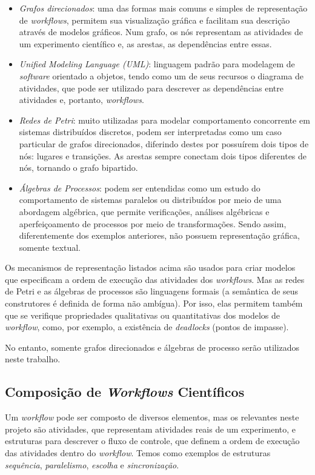 \documentclass[a4paper,11pt]{article}
\begin{document}
  	\begin{itemize}
  		\item \emph{Grafos direcionados}: uma das formas mais comuns e simples de representação de \emph{workflows}, permitem sua visualização gráfica e facilitam sua descrição através de modelos gráficos. Num grafo, os nós representam as atividades de um experimento científico e, as arestas, as dependências entre essas.

  		\item \emph{\emph{Unified Modeling Language} (UML)}: linguagem padrão para modelagem de \emph{software} orientado a objetos, tendo como um de seus recursos o diagrama de atividades, que pode ser utilizado para descrever as dependências entre atividades e, portanto, \emph{workflows}. 

        \item \emph{Redes de Petri}: muito utilizadas para modelar comportamento concorrente em sistemas distribuídos discretos, podem ser interpretadas como um caso particular de grafos direcionados, diferindo destes por possuírem dois tipos de nós: lugares e transições. As arestas sempre conectam dois tipos diferentes de nós, tornando o grafo bipartido.

  		\item \emph{Álgebras de Processos}: podem ser entendidas como um estudo do comportamento de sistemas paralelos ou distribuídos por meio de uma abordagem algébrica, que permite verificações, análises algébricas e aperfeiçoamento de processos por meio de transformações. Sendo assim, diferentemente dos exemplos anteriores, não possuem representação gráfica, somente textual.
 		
  	\end{itemize}

    Os mecanismos de representação listados acima são usados para criar modelos que especificam a ordem de execução das atividades dos \emph{workflows}. Mas as redes de Petri e as \'algebras de processos são linguagens formais (a sem\^antica de seus construtores \'e definida de forma não amb\'igua). Por isso, elas permitem tamb\'em que se verifique propriedades qualitativas ou quantitativas dos modelos de \emph{workflow}, como, por exemplo, a exist\^encia de \emph{deadlocks} (pontos de impasse). 

  	No entanto, somente grafos direcionados e álgebras de processo serão utilizados neste trabalho.

    \newpage
  	\subsection{Composição de \emph{Workflows} Científicos}
        Um \emph{workflow} pode ser composto de diversos elementos, mas os relevantes neste projeto são atividades, que representam atividades reais de um experimento, e estruturas para descrever o fluxo de controle, que definem a ordem de execução das atividades dentro do \emph{workflow}. Temos como exemplos de estruturas \emph{sequência}, \emph{paralelismo}, \emph{escolha} e \emph{sincronização}.
\end{document}
